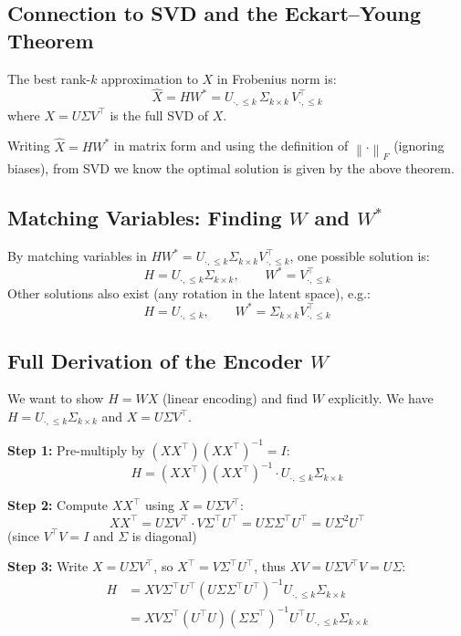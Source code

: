 \documentclass[12pt,a4paper]{article}
\newcommand{\norm}[1]{\left\|#1\right\|}
\begin{document}
\subsection{Connection to SVD and the Eckart--Young Theorem}

\begin{thmbox}[title={Eckart--Young--Mirsky Theorem}]
The best rank-$k$ approximation to $X$ in Frobenius norm is:
\[
\hat{X} = HW^* = U_{\cdot,\leq k}\,\Sigma_{k\times k}\,V_{\cdot,\leq k}^\top
\]
where $X = U\Sigma V^\top$ is the full SVD of $X$.
\end{thmbox}

Writing $\hat{X} = HW^*$ in matrix form and using the definition of $\norm{\cdot}_F$ (ignoring biases), from SVD we know the optimal solution is given by the above theorem.

\subsection{Matching Variables: Finding $W$ and $W^*$}

By matching variables in $HW^* = U_{\cdot,\leq k}\Sigma_{k\times k}V_{\cdot,\leq k}^\top$, one possible solution is:
\[
H = U_{\cdot,\leq k}\Sigma_{k\times k},
\qquad
W^* = V_{\cdot,\leq k}^\top
\]
Other solutions also exist (any rotation in the latent space), e.g.:
\[
H = U_{\cdot,\leq k},\qquad W^* = \Sigma_{k\times k}V_{\cdot,\leq k}^\top
\]

\subsection{Full Derivation of the Encoder $W$}

We want to show $H = WX$ (linear encoding) and find $W$ explicitly. We have $H = U_{\cdot,\leq k}\Sigma_{k\times k}$ and $X = U\Sigma V^\top$.

\textbf{Step 1:} Pre-multiply by $(XX^\top)(XX^\top)^{-1} = I$:
\[
H = (XX^\top)(XX^\top)^{-1} \cdot U_{\cdot,\leq k}\Sigma_{k\times k}
\]

\textbf{Step 2:} Compute $XX^\top$ using $X = U\Sigma V^\top$:
\[
XX^\top = U\Sigma V^\top \cdot V\Sigma^\top U^\top = U\Sigma\Sigma^\top U^\top = U\Sigma^2 U^\top
\]
(since $V^\top V = I$ and $\Sigma$ is diagonal)

\textbf{Step 3:} Write $X = U\Sigma V^\top$, so $X^\top = V\Sigma^\top U^\top$, thus $XV = U\Sigma V^\top V = U\Sigma$:
\begin{align*}
H &= XV\Sigma^\top U^\top (U\Sigma\Sigma^\top U^\top)^{-1} U_{\cdot,\leq k}\Sigma_{k\times k}\\
  &= XV\Sigma^\top (U^\top U)(\Sigma\Sigma^\top)^{-1} U^\top U_{\cdot,\leq k}\Sigma_{k\times k}
\end{align*}
\end{document}
